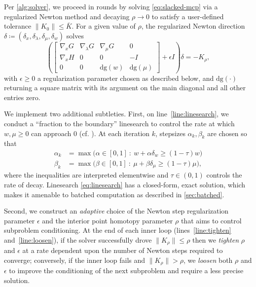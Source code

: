 \documentclass[conference]{IEEEtran}
\begin{document}
Per \cref{alg:solver}, we proceed in rounds by solving
\cref{eq:slacked-mcp} via a regularized Newton method and decaying $\rho \to 0$
to satisfy a user-defined tolerance $\|K_0\|
\le \bar K$.
For a given value of $\rho$, the regularized Newton direction $\delta \coloneqq
(\delta_x, \delta_\lambda, \delta_\mu, \delta_w)$ solves
\begin{equation}
  \label{eq:newton}
  \left(\begin{bmatrix}
    \nabla_x G & \nabla_\lambda G & \nabla_\mu G & 0\\
    \nabla_x H & 0 & 0 & -I \\
    0 & 0 & \mathrm{dg}(w) & \mathrm{dg}(\mu)
  \end{bmatrix} + \epsilon I\right) \delta = -K_\rho,
\end{equation}
with $\epsilon \ge 0$ a regularization parameter chosen as described below, and
$\mathrm{dg}(\cdot)$ returning a square matrix with its argument on the main diagonal
and all other entries zero.

We implement two additional subtleties. First, on line~\ref{line:linesearch}, we conduct a
``fraction to the boundary'' linesearch to control the rate at which $w, \mu
\ge 0$ can approach $0$ (cf. \cite[\S19]{nocedal2006numerical}). At each iteration $k$, stepsizes $\alpha_k, \beta_k$ are chosen so that
\begin{equation}
\label{eq:linesearch}
\begin{aligned}
  \alpha_k &= \max\big(\alpha \in [0, 1] ~:~ w + \alpha \delta_w \ge (1 - \tau) w\big)\\
  \beta_k &= \max\big(\beta \in [0, 1] ~:~ \mu + \beta \delta_\mu \ge (1 - \tau) \mu\big),
\end{aligned}
\end{equation}
where the inequalities are interpreted elementwise and $\tau \in (0, 1)$ controls the rate of decay. Linesearch
\cref{eq:linesearch} has a closed-form, exact solution, which makes it amenable
to batched computation as described in \cref{sec:batched}.

Second, we construct an \emph{adaptive} choice of the Newton step regularization
parameter $\epsilon$ and the interior point homotopy parameter $\rho$ that aims
to control subproblem conditioning.
At the end of each inner loop (lines~\ref{line:tighten} and~\ref{line:loosen}), if the solver successfully drove $\|K_\rho\| \le
\rho$ then we \emph{tighten} $\rho$ and $\epsilon$ at a rate dependent upon the
number of Newton steps required to converge; conversely, if the inner loop fails
and $\|K_\rho\| > \rho$, we \emph{loosen} both $\rho$ and
$\epsilon$ to improve the conditioning of the next subproblem and require a less
precise solution.
\end{document}
